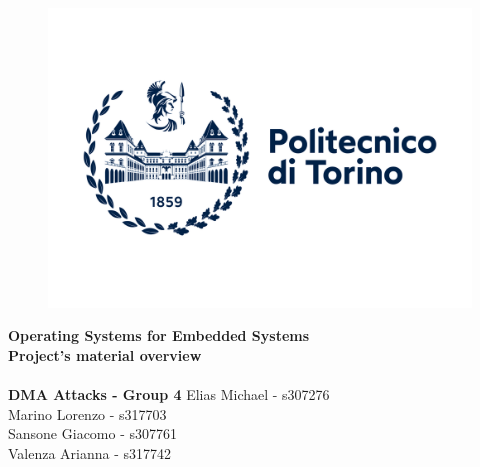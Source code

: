 \begin{figure}
    \centering
    \includegraphics[width=12cm]{images/polito_logo_2021_blu.jpg}
\end{figure}

\begin{titlepage}
\centering
\LARGE\textbf{Operating Systems for Embedded Systems\\}
\vspace{1em}
\Large\textbf{Project's material overview\\}
\large\textbf{\\DMA Attacks - Group 4}
\vfill
\centering\Large
Elias Michael - s307276\\
Marino Lorenzo - s317703\\
Sansone Giacomo - s307761\\
Valenza Arianna - s317742\\
\end{titlepage}